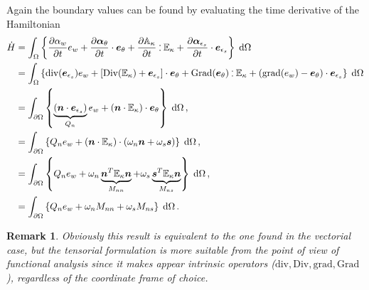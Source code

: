 \documentclass[preprint,12pt]{elsarticle}
\newtheorem{remark}{Remark}
\def\onedot{$\mathsurround0pt\ldotp$}
\def\cddot{%
	\mathbin{\vcenter{\baselineskip.67ex
			\hbox{\onedot}\hbox{\onedot}}%
}}
\begin{document}
Again the boundary values can be found by evaluating the time derivative of the Hamiltonian
\begin{equation}
\begin{aligned}
\dot{H}&= \int_{\Omega} \left\{ \diffp{\alpha_w}{t} e_w  + \diffp{\bm\alpha_\theta}{t} \cdot \bm{e}_\theta + \diffp{\mathbb{A}_{\kappa}}{t} \cddot \mathbb{E}_{\kappa}  + \diffp{\bm\alpha_{\epsilon_s}}{t} \cdot \bm{e}_{\epsilon_s} \right\} \d\Omega \\
&= \int_{\Omega} \left\{ \mathrm{div}(\bm{e}_{\epsilon_s}) e_w  + \left[\mathrm{Div}(\mathbb{E}_{\kappa}) + \bm{e}_{\epsilon_s} \right] \cdot \bm{e}_\theta + \mathrm{Grad}(\bm{e}_{\theta}) \cddot \mathbb{E}_{\kappa}  + (\mathrm{grad} (e_w) - \bm{e}_{\theta}) \cdot \bm{e}_{\epsilon_s} \right\} \d\Omega \\
&= \int_{\partial \Omega} \left\{ \underbrace{(\bm{n} \cdot \bm{e}_{\epsilon_s})}_{Q_n} e_w  + (\bm{n} \cdot \mathbb{E}_{\kappa}) \cdot \bm{e}_\theta \right\} \d\Omega\,, \\
&= \int_{\partial \Omega} \left\{ Q_n e_w  + (\bm{n} \cdot \mathbb{E}_{\kappa}) \cdot (\omega_n \bm{n} + \omega_s \bm{s}) \right\} \d\Omega\,, \\&= \int_{\partial \Omega} \left\{ Q_n e_w  + \omega_n  \underbrace{\bm{n}^T \mathbb{E}_{\kappa} \bm{n}}_{M_{nn}} + \omega_s \underbrace{\bm{s}^T \mathbb{E}_{\kappa} \bm{n}}_{M_{ns}} \right\} \d\Omega\,, \\
&= \int_{\partial \Omega} \left\{ Q_n e_w  + \omega_n M_{nn} + \omega_s M_{ns} \right\} \d\Omega\,.  \\
\end{aligned}
\end{equation}
\begin{remark}
Obviously this result is equivalent to the one found in the vectorial case, but the tensorial formulation is more suitable from the point of view of functional analysis since it makes appear intrinsic operators ($\mathrm{div}, \mathrm{Div}, \mathrm{grad}, \mathrm{Grad}$), regardless of the coordinate frame of choice.
\end{remark}
\end{document}

